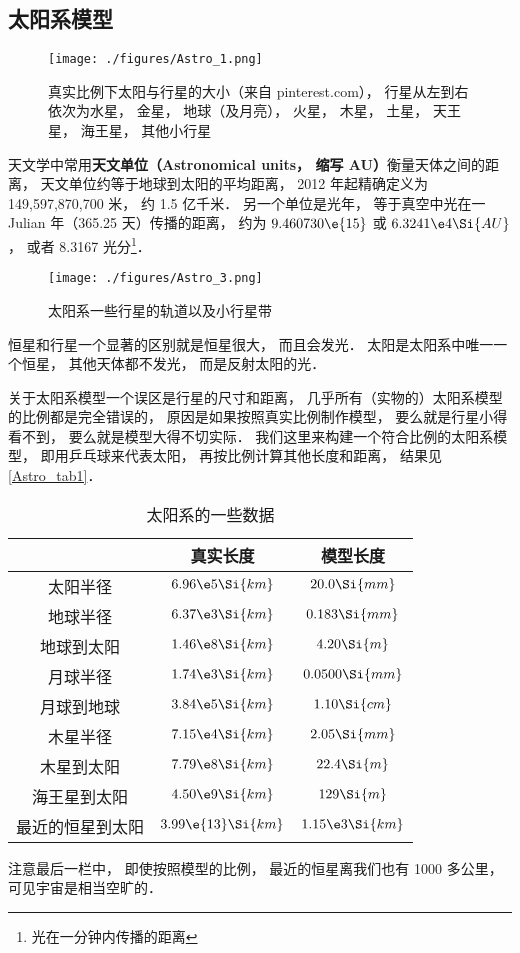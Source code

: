 
\subsection{太阳系模型}

\begin{figure}[ht]
\centering
\texttt{[image: ./figures/Astro\_1.png]}
\caption{真实比例下太阳与行星的大小（来自 pinterest.com）， 行星从左到右依次为水星， 金星， 地球（及月亮）， 火星， 木星， 土星， 天王星， 海王星， 其他小行星} \label{Astro_fig1}
\end{figure}

天文学中常用\textbf{天文单位（Astronomical units， 缩写 AU）}衡量天体之间的距离， 天文单位约等于地球到太阳的平均距离， 2012 年起精确定义为 149,597,870,700 米， 约 1.5 亿千米． 另一个单位是光年， 等于真空中光在一 Julian 年（365.25 天）传播的距离， 约为 $9.460730\e{15}$ 或 $6.3241\e4\Si{AU}$， 或者 8.3167 光分\footnote{光在一分钟内传播的距离}．

\begin{figure}[ht]
\centering
\texttt{[image: ./figures/Astro\_3.png]}
\caption{太阳系一些行星的轨道以及小行星带} \label{Astro_fig3}
\end{figure}

恒星和行星一个显著的区别就是恒星很大， 而且会发光． 太阳是太阳系中唯一一个恒星， 其他天体都不发光， 而是反射太阳的光．

关于太阳系模型一个误区是行星的尺寸和距离， 几乎所有（实物的）太阳系模型的比例都是完全错误的， 原因是如果按照真实比例制作模型， 要么就是行星小得看不到， 要么就是模型大得不切实际． 我们这里来构建一个符合比例的太阳系模型， 即用乒乓球来代表太阳， 再按比例计算其他长度和距离， 结果见\autoref{Astro_tab1}．

\begin{table}[ht]
\centering
\caption{太阳系的一些数据}\label{Astro_tab1}
\begin{tabular}{|c|c|c|}
\hline
 & 真实长度 & 模型长度 \\
\hline
太阳半径 & $6.96\e5 \Si{km}$ & $20.0 \Si{mm}$\\
\hline
地球半径 &  $6.37\e3 \Si{km}$ & $0.183 \Si{mm}$\\
\hline
地球到太阳  &  $1.46\e8 \Si{km}$ & $4.20 \Si{m}$\\
\hline
月球半径 & $1.74\e3 \Si{km}$ & $0.0500 \Si{mm}$\\
\hline
月球到地球 & $3.84\e5 \Si{km}$ &  $1.10 \Si{cm}$\\
\hline
木星半径 & $7.15\e4 \Si{km}$ & $2.05 \Si{mm}$\\
\hline
木星到太阳 & $7.79\e8 \Si{km}$ & $22.4 \Si{m}$\\
\hline
海王星到太阳 & $4.50\e9 \Si{km}$ & $129 \Si{m}$\\
\hline
最近的恒星到太阳 & $3.99\e{13} \Si{km}$ &  $1.15\e3 \Si{km}$\\
\hline
\end{tabular}
\end{table}
注意最后一栏中， 即使按照模型的比例， 最近的恒星离我们也有 1000 多公里， 可见宇宙是相当空旷的．

